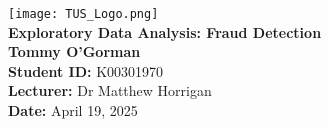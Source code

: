 \thispagestyle{empty}
\begin{center}
  \vspace*{2cm}
  \texttt{[image: TUS\_Logo.png]}\\[2em]
  \LARGE \textbf{Exploratory Data Analysis: Fraud Detection}\\[4em]
  \large
  \textbf{Tommy O'Gorman} \\[0.5em]
  \textbf{Student ID:} K00301970 \\[0.5em]
  \textbf{Lecturer:} Dr Matthew Horrigan \\[0.5em]
  \textbf{Date:} April 19, 2025
\end{center}
\newpage
